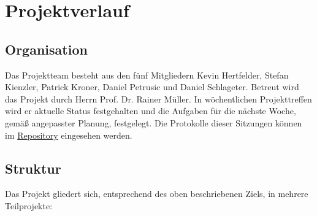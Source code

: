 \chapter{Projektverlauf}
	
	\section{Organisation}
	
	Das Projektteam besteht aus den fünf Mitgliedern Kevin Hertfelder, Stefan Kienzler, Patrick Kroner, Daniel Petrusic und Daniel Schlageter. Betreut wird das Projekt durch Herrn Prof. Dr. Rainer Müller. In wöchentlichen Projekttreffen wird er aktuelle Status festgehalten und die Aufgaben für die nächste Woche, gemäß angepasster Planung, festgelegt. Die Protokolle dieser Sitzungen können im \href{https://github.com/OpenPearl-HFUWPV1718/SensorCar}{Repository} eingesehen werden.\\
	
	
	\section{Struktur}
	Das Projekt gliedert sich, entsprechend des oben beschriebenen Ziels, in mehrere Teilprojekte:
	

